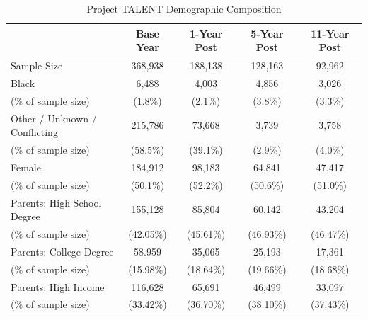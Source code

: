 \documentclass[onehalfspacing,11pt]{article}
\begin{document}
\begin{table}[h!]
  \centering 
  \begin{tabular}{lcccc}
\toprule
   & Base Year & 1-Year Post & 5-Year Post & 11-Year Post\\
   \midrule
Sample Size & 368,938 & 188,138 & 128,163 & 92,962 \\
\midrule
Black   & 6,488 & 4,003 & 4,856 & 3,026 \\

\quad (\% of sample size) & (1.8\%) & (2.1\%) & (3.8\%) & (3.3\%) \\
%
\midrule
Other / Unknown / Conflicting & 215,786 & 73,668 & 3,739 & 3,758 \\
\quad (\% of sample size) & (58.5\%) & (39.1\%) & (2.9\%) & (4.0\%) \\
\midrule
Female   & 184,912 & 98,183 & 64,841 & 47,417 \\
\quad (\% of sample size) & (50.1\%) & (52.2\%) & (50.6\%) & (51.0\%) \\
\midrule
Parents: High School Degree & 155,128 & 85,804 & 60,142 & 43,204 \\
\quad (\% of sample size) & (42.05\%) & (45.61\%) & (46.93\%) & (46.47\%)\\
\midrule
Parents: College Degree & 58.959 & 35,065 & 25,193 & 17,361 \\
\quad (\% of sample size) & (15.98\%) & (18.64\%) & (19.66\%) & (18.68\%)\\
\midrule
Parents: High Income & 116,628 & 65,691 & 46,499 & 33,097 \\
\quad (\% of sample size) & (33.42\%) & (36.70\%) & (38.10\%) & (37.43\%) \\
\midrule
\bottomrule
\end{tabular}

\caption{Project TALENT Demographic Composition}
\label{tab:samplebywave}
\end{table}

\end{document}

